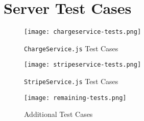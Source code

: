 \chapter{Server Test Cases}
\label{appendix:server-test-cases}

\begin{figure}[!hbt]
  	\centering
 	\texttt{[image: chargeservice-tests.png]}
  	\caption{\texttt{ChargeService.js} Test Cases}
 	\label{fig:chargeservice-tests}
\end{figure}

\begin{figure}[!hbt]
  	\centering
 	\texttt{[image: stripeservice-tests.png]}
  	\caption{\texttt{StripeService.js} Test Cases}
 	\label{fig:stripeservice-tests}
\end{figure}

\begin{figure}[!hbt]
  	\centering
 	\texttt{[image: remaining-tests.png]}
  	\caption{Additional Test Cases}
 	\label{fig:additional-tests}
\end{figure}